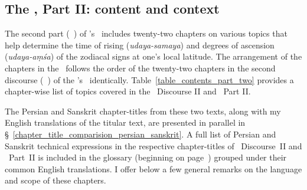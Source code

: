 \subsection{The \Siddhantasindhu, Part II: content and context}
\label{comparative_overview_chapters_zij_sindhu}

The second part (\dvitiya\ \kanda) of \Nityananda's \Siddhantasindhu\ includes twenty-two chapters on various topics that help determine the time of rising (\textit{udaya-samaya}) and degrees of ascension (\textit{udaya-aṃśa}) of the zodiacal signs at one's local latitude. The arrangement of the chapters in the \Siddhantasindhu\ follows the order of the twenty-two chapters in the second discourse (\maqala\idafaconsonant\ \duvum) of the \MullaFarid's \ZijiShahJahani\ identically. Table~\ref{table_contents_part_two} provides a chapter-wise list of topics covered in the \ZijiShahJahani\ Discourse II and \Siddhantasindhu\ Part II. 

The Persian and Sanskrit chapter-titles from these two texts, along with my English translations of the titular text, are presented in parallel in \S~\ref{chapter_title_comparision_persian_sanskrit}.  A full list of Persian and Sanskrit technical expressions in the respective chapter-titles of \ZijiShahJahani\ Discourse~II and \Siddhantasindhu\ Part~II is included in the glossary (beginning on page~\pageref{main}) grouped under their common English translations. I offer below a few general remarks on the language and scope of these chapters.

